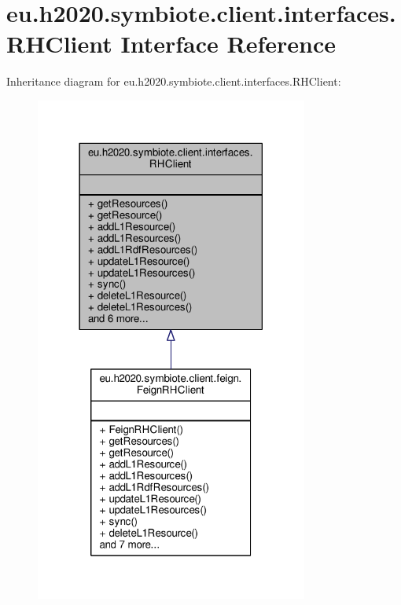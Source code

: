 \hypertarget{interfaceeu_1_1h2020_1_1symbiote_1_1client_1_1interfaces_1_1RHClient}{}\section{eu.\+h2020.\+symbiote.\+client.\+interfaces.\+R\+H\+Client Interface Reference}
\label{interfaceeu_1_1h2020_1_1symbiote_1_1client_1_1interfaces_1_1RHClient}


Inheritance diagram for eu.\+h2020.\+symbiote.\+client.\+interfaces.\+R\+H\+Client\+:
\nopagebreak
\begin{figure}[H]
\begin{center}
\leavevmode
\includegraphics[width=254pt]{interfaceeu_1_1h2020_1_1symbiote_1_1client_1_1interfaces_1_1RHClient__inherit__graph}
\end{center}
\end{figure}


